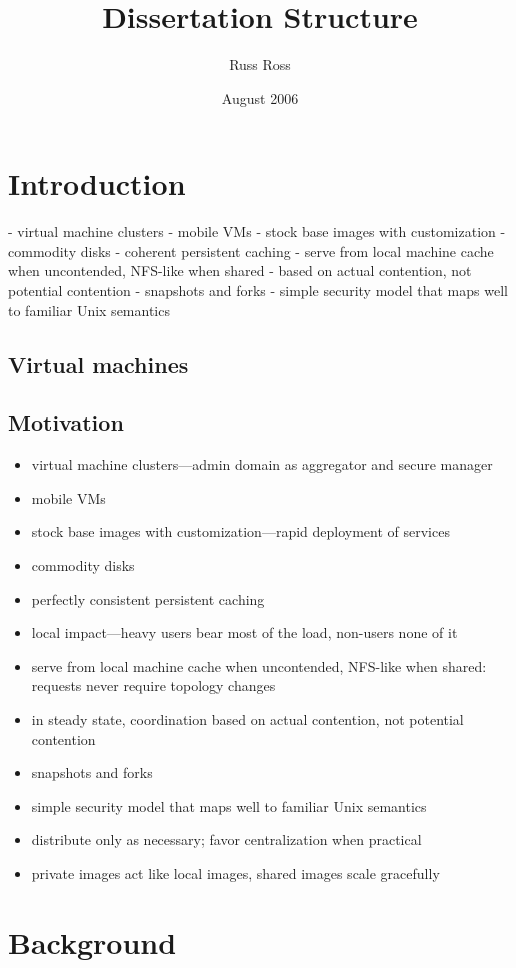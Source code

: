 \documentclass[a4paper]{article}
\title{Dissertation Structure}
\author{Russ Ross}
\date{August 2006}
\begin{document}
\maketitle

\section{Introduction}


- virtual machine clusters
- mobile VMs
- stock base images with customization
- commodity disks
- coherent persistent caching
- serve from local machine cache when uncontended, NFS-like when shared
  - based on actual contention, not potential contention
- snapshots and forks
- simple security model that maps well to familiar Unix semantics

\subsection{Virtual machines}
\subsection{Motivation}
\begin{itemize}
\item virtual machine clusters---admin domain as aggregator and secure manager
\item mobile VMs
\item stock base images with customization---rapid deployment of services
\item commodity disks
\item perfectly consistent persistent caching
\item local impact---heavy users bear most of the load, non-users none of it
\item serve from local machine cache when uncontended, NFS-like when shared: requests never require topology changes
\item in steady state, coordination based on actual contention, not potential contention
\item snapshots and forks
\item simple security model that maps well to familiar Unix semantics
\item distribute only as necessary; favor centralization when practical
\item private images act like local images, shared images scale gracefully
\end{itemize}


\section{Background}
\end{document}
